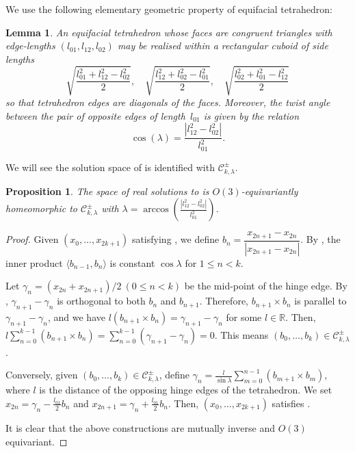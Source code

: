 \documentclass[10pt,leqno]{amsart}
\newcommand{\R}{\mathbb{R}}
\newcommand{\conf}{\mathcal{C}}
\newtheorem{lem}[theorem]{Lemma}
\newtheorem{prop}[theorem]{Proposition}
\numberwithin{equation}{section}
\begin{document}
We use the following elementary geometric property of 
equifacial tetrahedron:
\begin{lem}\label{lem:equifacial}
An equifacial tetrahedron whose faces are congruent triangles with edge-lengths $(l_{01}, l_{12}, l_{02})$ may be realised within a rectangular cuboid
 of side lengths
\[
\sqrt{\frac{l_{01}^2 + l_{12}^2 - l_{02}^2}{2}}, \quad \sqrt{\frac{l_{12}^2 + l_{02}^2 - l_{01}^2}{2}}, \quad \sqrt{\frac{l_{02}^2 + l_{01}^2 - l_{12}^2}{2}}
\]
so that tetrahedron edges are diagonals of the faces.
Moreover, the twist angle between the pair of opposite edges of length~$l_{01}$ is given by the relation
\[
 \cos(\lambda) = \frac{|l_{12}^2 - l_{02}^2|}{l_{01}^2}.
 \]
\end{lem}

We will see the solution space of  is identified with $\conf^\pm_{k,\lambda}$.

\begin{prop}\label{prop:configuration-space}
    The space of real solutions to 
    is $O(3)$-equivariantly homeomorphic to $\conf^\pm_{k,\lambda}$ with 
    $\lambda=\arccos\left(\frac{|l_{12}^2 - l_{02}^2|}{l_{01}^2}\right)$.    
\end{prop}
\begin{proof}
Given $(x_0,\ldots,x_{2k+1})$ satisfying ,
we define $b_n=\dfrac{x_{2n+1}-x_{2n}}{|x_{2n+1}-x_{2n}|}$.
By , the inner product 
$\langle b_{n-1}, b_{n} \rangle$ is constant
$\cos\lambda$ for $1\le n<k$. 

Let $\gamma_n = (x_{2n}+x_{2n+1})/2 \ (0\le n<k)$ be the mid-point of the hinge edge.
By , $\gamma_{n+1}-\gamma_{n}$
is orthogonal to both $b_{n}$ and 
$b_{n+1}$.
Therefore, $b_{n+1}\times b_{n}$ is parallel to $\gamma_{n+1}-\gamma_n$, and we have
$l(b_{n+1}\times b_{n})=\gamma_{n+1}-\gamma_{n}$
for some $l\in \R$.
Then, $l\sum_{n=0}^{k-1}( b_{n+1}\times b_{n}) =
\sum_{n=0}^{k-1}(\gamma_{n+1}-\gamma_n)=0$.
This means $(b_0,\ldots,b_k)\in \conf^\pm_{k,\lambda}$.

Conversely, given $(b_0,\ldots,b_k)\in \conf^\pm_{k,\lambda}$,
define $\gamma_n=\frac{l}{\sin\lambda} \sum_{m=0}^{n-1}(b_{m+1}\times b_{m})$,
where $l$ is the distance of the opposing hinge edges of the tetrahedron.
We set $x_{2n}=\gamma_{n} - \frac{l_{01}}{2} b_n$
and  $x_{2n+1}=\gamma_n +\frac{l_{01}}{2} b_n$.
Then, $(x_0,\ldots,x_{2k+1})$ satisfies 
.

It is clear that
the above constructions are mutually inverse and $O(3)$ equivariant.
\end{proof}
\end{document}
